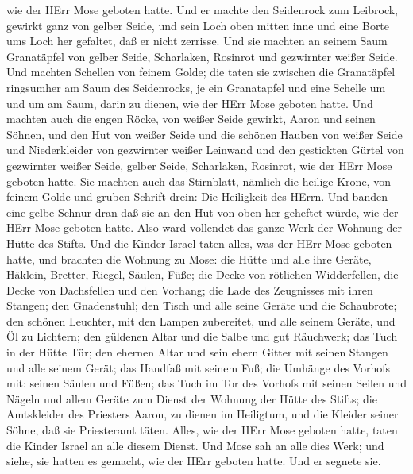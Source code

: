wie der HErr Mose geboten hatte.  Und er machte den
Seidenrock zum Leibrock, gewirkt ganz von gelber Seide, 
und sein Loch oben mitten inne und eine Borte ums Loch her gefaltet, daß
er nicht zerrisse.  Und sie machten an seinem Saum
Granatäpfel von gelber Seide, Scharlaken, Rosinrot und gezwirnter weißer
Seide.  Und machten Schellen von feinem Golde; die taten
sie zwischen die Granatäpfel ringsumher am Saum des Seidenrocks,
 je ein Granatapfel und eine Schelle um und um am Saum,
darin zu dienen, wie der HErr Mose geboten hatte.  Und
machten auch die engen Röcke, von weißer Seide gewirkt, Aaron und seinen
Söhnen,  und den Hut von weißer Seide und die schönen
Hauben von weißer Seide und Niederkleider von gezwirnter weißer Leinwand
 und den gestickten Gürtel von gezwirnter weißer Seide,
gelber Seide, Scharlaken, Rosinrot, wie der HErr Mose geboten hatte.
 Sie machten auch das Stirnblatt, nämlich die heilige
Krone, von feinem Golde und gruben Schrift drein: Die Heiligkeit des
HErrn.  Und banden eine gelbe Schnur dran daß sie an den
Hut von oben her geheftet würde, wie der HErr Mose geboten hatte.
 Also ward vollendet das ganze Werk der Wohnung der Hütte
des Stifts. Und die Kinder Israel taten alles, was der HErr Mose geboten
hatte,  und brachten die Wohnung zu Mose: die Hütte und
alle ihre Geräte, Häklein, Bretter, Riegel, Säulen, Füße; 
die Decke von rötlichen Widderfellen, die Decke von Dachsfellen und den
Vorhang;  die Lade des Zeugnisses mit ihren Stangen; den
Gnadenstuhl;  den Tisch und alle seine Geräte und die
Schaubrote;  den schönen Leuchter, mit den Lampen
zubereitet, und alle seinem Geräte, und Öl zu Lichtern; 
den güldenen Altar und die Salbe und gut Räuchwerk; das Tuch in der
Hütte Tür;  den ehernen Altar und sein ehern Gitter mit
seinen Stangen und alle seinem Gerät; das Handfaß mit seinem Fuß;
 die Umhänge des Vorhofs mit: seinen Säulen und Füßen; das
Tuch im Tor des Vorhofs mit seinen Seilen und Nägeln und allem Geräte
zum Dienst der Wohnung der Hütte des Stifts;  die
Amtskleider des Priesters Aaron, zu dienen im Heiligtum, und die Kleider
seiner Söhne, daß sie Priesteramt täten.  Alles, wie der
HErr Mose geboten hatte, taten die Kinder Israel an alle diesem Dienst.
 Und Mose sah an alle dies Werk; und siehe, sie hatten es
gemacht, wie der HErr geboten hatte. Und er segnete sie.


